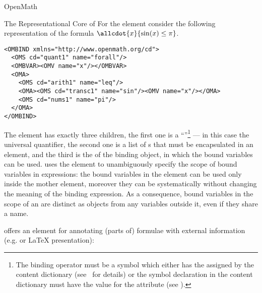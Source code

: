 \begin{omgroup}[id=mobj,short=Mathematical Objects]
\begin{omgroup}[id=openmath]{OpenMath}
\begin{module}[id=OpenMath]
\begin{omgroup}[id=om.core]{The Representational Core of {\openmath}}
For the {} element consider the following representation of the
formula $\allcdot{x}{\sin(x)\leq\pi}$.
\begin{lstlisting}[label=allxsinx,language=OpenMath,numbers=none,
   index={OMA,OMV,OMBIND,OMBVAR}]
<OMBIND xmlns="http://www.openmath.org/cd">
  <OMS cd="quant1" name="forall"/>
  <OMBVAR><OMV name="x"/></OMBVAR>
  <OMA>
    <OMS cd="arith1" name="leq"/>
    <OMA><OMS cd="transc1" name="sin"/><OMV name="x"/></OMA>
    <OMS cd="nums1" name="pi"/>
  </OMA>
</OMBIND>
\end{lstlisting}
\begin{definition}[id=ombind.def]
  The {} element has exactly three children, the first one is a
  ``{}''\footnote{%
    The binding operator must be a symbol which either has the {}
    {} assigned by the {\openmath} content dictionary
    (see~\cite{BusCapCar:2oms04} for details) or the symbol declaration in the {\omdoc}
    content dictionary must have the value {} for the
    attribute {} (see {}).} --- in this case the
  universal quantifier, the second one is a list of {s} that must
  be encapsulated in an {} element, and the third is the
  {} of the binding object, in which the bound variables can be used.
  {\openmath} uses the {} element to unambiguously specify the
  scope of bound variables in expressions: the bound variables in the
  {} element can be used only inside the mother
  {} element, moreover they can be systematically
   without changing the meaning of the binding
  expression. As a consequence, bound variables in the scope of an
  {} are distinct as {\openmath} objects from any variables
  outside it, even if they share a name.
\end{definition}

{\openmath} offers an element for annotating (parts of) formulae with external information
(e.g. {\mathml} or {\LaTeX} presentation): 


\end{omgroup}
\end{module}
\end{omgroup}
\end{omgroup}
